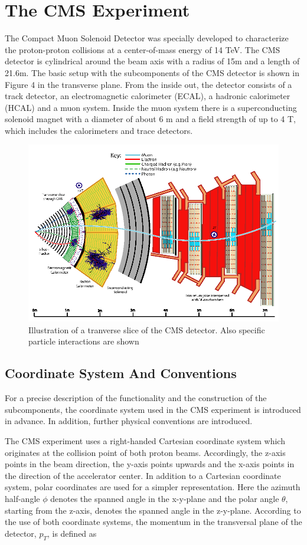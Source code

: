\documentclass[12pt, a4paper]{thesis}
\begin{document}
\section{The CMS Experiment}
\label{sec:orge5edd5f}
The Compact Muon Solenoid Detector was specially developed to characterize the
proton-proton collisions at a center-of-mass energy of 14 TeV. The CMS detector
is cylindrical around the beam axis with a radius of 15m and a length of
21.6m. The basic setup with the subcomponents of the CMS detector is shown in
Figure 4 in the transverse plane.  From the inside out, the detector consists of
a track detector, an electromagnetic calorimeter (ECAL), a hadronic calorimeter
(HCAL) and a muon system.  
Inside the muon system there is a superconducting
solenoid magnet with a diameter of about 6 m and a field strength of up to 4 T,
which includes the calorimeters and trace detectors.
\begin{figure}[htbp]
\centering
\includegraphics[width=0.8 \textwidth]{../images/cms_detector.png}
\caption{Illustration of a tranverse slice of the CMS detector. Also specific particle interactions are shown \cite{sirunyan17}}
\end{figure}

\subsection{Coordinate System And Conventions}
\label{sec:org067f254}

For a precise description of the functionality and the construction of the
subcomponents, the coordinate system used in the CMS experiment is introduced in
advance. In addition, further physical conventions are introduced.

The CMS experiment uses a right-handed Cartesian coordinate system which
originates at the collision point of both proton beams. Accordingly, the z-axis
points in the beam direction, the y-axis points upwards and the x-axis points in
the direction of the accelerator center. In addition to a Cartesian coordinate
system, polar coordinates are used for a simpler representation. Here the
azimuth half-angle \(\phi\) denotes the spanned angle in the x-y-plane and the polar
angle \(\theta\), starting from the z-axis, denotes the spanned angle in the
z-y-plane.
According to the use of both coordinate systems, the momentum in the transversal
plane of the detector, \(p_T\), is defined as
\end{document}
